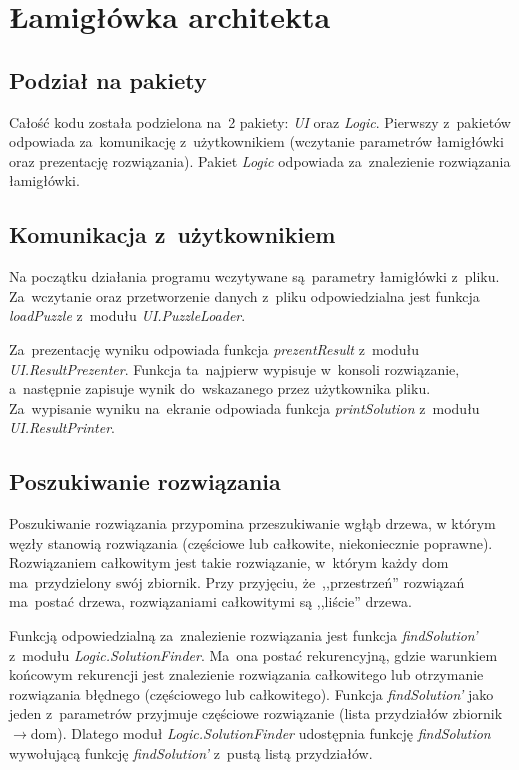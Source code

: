 \documentclass[11pt,a4paper]{article}
\begin{document}
\section*{Łamigłówka architekta}
\subsection*{Podział na pakiety}
Całość kodu została podzielona na~2 pakiety: \textit{UI} oraz \textit{Logic}.
Pierwszy z~pakietów odpowiada za~komunikację z~użytkownikiem (wczytanie
parametrów łamigłówki oraz prezentację rozwiązania). Pakiet \textit{Logic}
odpowiada za~znalezienie rozwiązania łamigłówki.

\subsection*{Komunikacja z~użytkownikiem}
Na początku działania programu wczytywane są~parametry łamigłówki z~pliku.
Za~wczytanie oraz przetworzenie danych z~pliku odpowiedzialna jest funkcja
\textit{loadPuzzle} z~modułu \newline \textit{UI.PuzzleLoader}.

Za~prezentację wyniku odpowiada funkcja \textit{prezentResult} z~modułu
\textit{UI.ResultPrezenter}. Funkcja ta~najpierw wypisuje w~konsoli
rozwiązanie, a~następnie zapisuje wynik do~wskazanego przez użytkownika
pliku. Za~wypisanie wyniku na~ekranie odpowiada funkcja \textit{printSolution}
z~modułu \textit{UI.ResultPrinter}.

\subsection*{Poszukiwanie rozwiązania}
Poszukiwanie rozwiązania przypomina przeszukiwanie wgłąb drzewa, w którym
węzły stanowią rozwiązania (częściowe lub całkowite, niekoniecznie poprawne).
Rozwiązaniem całkowitym jest takie rozwiązanie, w~którym każdy dom
ma~przydzielony swój zbiornik. Przy przyjęciu, że~,,przestrzeń'' rozwiązań
ma~postać drzewa, rozwiązaniami całkowitymi są ,,liście'' drzewa.

Funkcją odpowiedzialną za~znalezienie rozwiązania jest funkcja
\textit{findSolution'} z~modułu \textit{Logic.SolutionFinder}. Ma~ona postać
rekurencyjną, gdzie warunkiem końcowym rekurencji jest znalezienie rozwiązania
całkowitego lub otrzymanie rozwiązania błędnego (częściowego lub całkowitego).
Funkcja \textit{findSolution'} jako jeden z~parametrów przyjmuje częściowe
rozwiązanie (lista przydziałów zbiornik$\rightarrow$dom). Dlatego moduł
\textit{Logic.SolutionFinder} udostępnia funkcję \textit{findSolution}
wywołującą funkcję \textit{findSolution'} z~pustą listą przydziałów.
\end{document}
